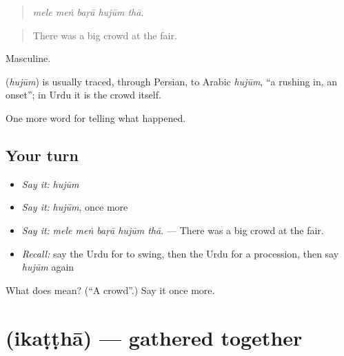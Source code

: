 \begin{quote}
    
\end{quote}

\begin{quote}
\emph{mele meṅ baṛā hujūm thā.}
\end{quote}

\begin{quote}
There was a big crowd at the fair.
\end{quote}

Masculine.

\begin{cousinweb}
\textbf{} (\emph{hujūm}) is usually traced, through Persian, to Arabic \emph{hujūm}, \textquotedblleft{}a rushing in, an onset\textquotedblright{}; in Urdu it is the crowd itself.
\end{cousinweb}

\begin{grammarlens}[title={What you've built}]
One more word for telling what happened.
\end{grammarlens}

\subsection*{Your turn}
\begin{itemize}
\raggedright
  \item \emph{Say it:} \emph{hujūm}
  \item \emph{Say it:} \emph{hujūm}, once more
  \item \emph{Say it:} \emph{mele meṅ baṛā hujūm thā.} — There was a big crowd at the fair.
  \item \emph{Recall:} say the Urdu for to swing, then the Urdu for a procession, then say \emph{hujūm} again
\end{itemize}

\begin{tcolorbox}[breakable,colback=teal!4,colframe=teal!35!black,title={Before you move on}]
What does  mean? (\textquotedblleft{}A crowd\textquotedblright{}.) Say it once more.
\end{tcolorbox}
\section[\texorpdfstring{\ur{اکٹھا} (ikaṭṭhā)}{اکٹھا (ikaṭṭhā)}]{ (ikaṭṭhā) — gathered together}

\label{lesson:UR-C321-ikattha}



